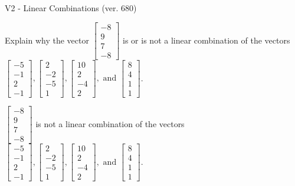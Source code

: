 \begin{exercise}
  \begin{exerciseTitle}V2 - Linear Combinations (ver. 680)\end{exerciseTitle}
  \begin{exerciseStatement}
    Explain why the vector \(\left[\begin{array}{c}
-8 \\
9 \\
7 \\
-8
\end{array}\right]\)  is or is not a linear 
	combination of the vectors \(\left[\begin{array}{c}
-5 \\
-1 \\
2 \\
-1
\end{array}\right] , \left[\begin{array}{c}
2 \\
-2 \\
-5 \\
1
\end{array}\right] , \left[\begin{array}{c}
10 \\
2 \\
-4 \\
2
\end{array}\right] , \text{ and } \left[\begin{array}{c}
8 \\
4 \\
1 \\
1
\end{array}\right]\).
	


  \end{exerciseStatement}
  \begin{exerciseAnswer}
   \(\left[\begin{array}{c}
-8 \\
9 \\
7 \\
-8
\end{array}\right]\) 
  	 is not  
	a linear combination of the vectors \(\left[\begin{array}{c}
-5 \\
-1 \\
2 \\
-1
\end{array}\right] , \left[\begin{array}{c}
2 \\
-2 \\
-5 \\
1
\end{array}\right] , \left[\begin{array}{c}
10 \\
2 \\
-4 \\
2
\end{array}\right] , \text{ and } \left[\begin{array}{c}
8 \\
4 \\
1 \\
1
\end{array}\right]\).


\end{exerciseAnswer}
\end{exercise}
